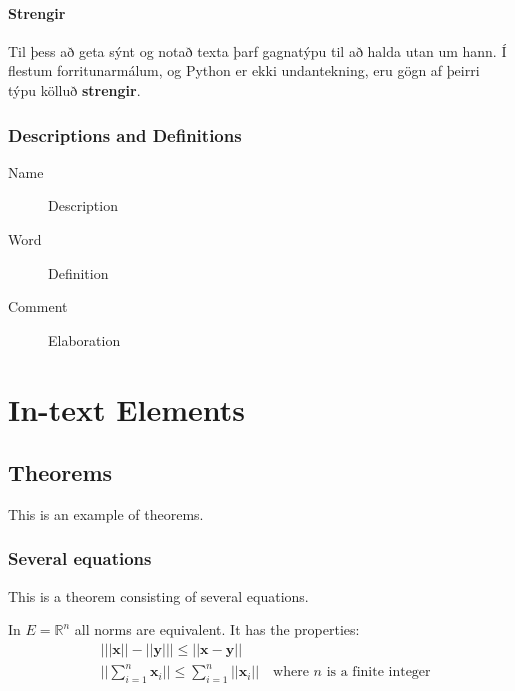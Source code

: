 \documentclass[11pt,fleqn]{book} %
\begin{document}

\subsubsection{Strengir}
Til þess að geta sýnt og notað texta þarf gagnatýpu til að halda utan um hann. Í flestum forritunarmálum, og Python er ekki undantekning, eru gögn af þeirri týpu kölluð \textbf{strengir}. 





\subsection{Descriptions and Definitions}

\begin{description}
\item[Name] Description
\item[Word] Definition
\item[Comment] Elaboration
\end{description}


\chapter{In-text Elements}

\section{Theorems}

This is an example of theorems.

\subsection{Several equations}
This is a theorem consisting of several equations.

\begin{theorem}
In $E=\mathbb{R}^n$ all norms are equivalent. It has the properties:
\begin{align}
& \big| ||\mathbf{x}|| - ||\mathbf{y}|| \big|\leq || \mathbf{x}- \mathbf{y}||\\
&  ||\sum_{i=1}^n\mathbf{x}_i||\leq \sum_{i=1}^n||\mathbf{x}_i||\quad\text{where $n$ is a finite integer}
\end{align}
\end{theorem}
\end{document}
